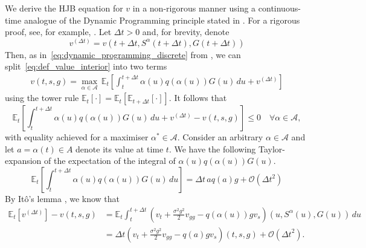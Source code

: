 \documentclass[main.tex]{subfiles}
\begin{document}
We derive the HJB equation for $v$ in a non-rigorous manner
using a
continuous-time analogue of the Dynamic Programming principle
stated in . For a rigorous proof,
see, for example, \citet[Ch.~3]{pham2009continuous}.
Let $\Delta{t}>0$ and, for brevity, denote
\begin{equation}
  v^{(\Delta{t})} =
  v(t+\Delta{t},S^\alpha(t+\Delta{t}),G(t+\Delta{t}))
\end{equation}
Then, as in~\eqref{eq:dynamic_programming_discrete} from
, we can
split~\eqref{eq:def_value_interior} into two terms
\begin{align}
  v(t,s,g) = \max_{\alpha\in\mathcal{A}}\,
  \mathbb{E}_{t}\left[
  \int_t^{t+\Delta{t}} \alpha(u)q(\alpha(u))G(u)\,du
  + v^{(\Delta{t})}\right]
\end{align}
using the tower rule $\mathbb{E}_t[\cdot] = \mathbb{E}_t[\mathbb{E}_{t+\Delta{t}}[\cdot]]$.
It follows that
\begin{equation}
  \label{eq:cts_bellman_principle_ineq}
  \mathbb{E}_{t}\left[
    \int_t^{t+\Delta{t}} \alpha(u)q(\alpha(u))G(u)\,du
    + v^{(\Delta{t})}-v(t,s,g)\right]
  \leq 0\quad  \forall \alpha\in\mathcal{A},
\end{equation}
with equality achieved for a maximiser $\alpha^*\in\mathcal{A}$.
Consider an arbitrary $\alpha\in\mathcal{A}$ and let $a=\alpha(t)\in
A$ denote its value at time $t$.
We have the following Taylor-expansion of the expectation of the
integral of $\alpha(u)q(\alpha(u))G(u)$.
\begin{equation}
  \mathbb{E}_{t}\left[
    \int_t^{t+\Delta{t}}
    \alpha(u)q(\alpha(u))G(u)\,du\right]
  = \Delta{t}\,aq(a)g  + \mathcal{O}({\Delta{t}}^2)
\end{equation}
By It\^{o}'s lemma \citep[Ch.~1]{pham2009continuous}, we know that
\begin{align}
  \mathbb{E}_t[v^{(\Delta{t})}]-v(t,s,g)
  &= \mathbb{E}_t  \int_t^{t+\Delta{t}}
    (v_t
    +{\textstyle\frac{\sigma^2g^2}{2}}
    v_{gg}
    -q(\alpha(u))g v_s)(u,S^{\alpha}(u),G(u))
    \,du\\
  &= \Delta{t}\left( v_t
    +{\textstyle\frac{\sigma^2g^2}{2}}
    v_{gg}
    -q(a)g v_s \right)(t,s,g) + \mathcal{O}({\Delta{t}}^2).
\end{align}
\end{document}
